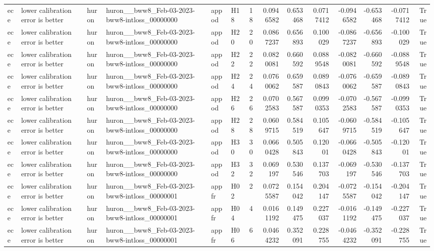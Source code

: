 \begin{longtable}{llllllrrrrrrrr}
ece & lower calibration error is better & huron & huron\_\_bww8\_Feb-03-2023-bww8-intloss\_00000000 & appod & H18 & 18 & 0.0946582 & 0.653468 & 0.0717412 & -0.0946582 & -0.653468 & -0.0717412 & True \\
ece & lower calibration error is better & huron & huron\_\_bww8\_Feb-03-2023-bww8-intloss\_00000000 & appod & H20 & 20 & 0.0867237 & 0.656893 & 0.100029 & -0.0867237 & -0.656893 & -0.100029 & True \\
ece & lower calibration error is better & huron & huron\_\_bww8\_Feb-03-2023-bww8-intloss\_00000000 & appod & H22 & 22 & 0.0820081 & 0.660592 & 0.0889548 & -0.0820081 & -0.660592 & -0.0889548 & True \\
ece & lower calibration error is better & huron & huron\_\_bww8\_Feb-03-2023-bww8-intloss\_00000000 & appod & H24 & 24 & 0.0760062 & 0.659587 & 0.0890843 & -0.0760062 & -0.659587 & -0.0890843 & True \\
ece & lower calibration error is better & huron & huron\_\_bww8\_Feb-03-2023-bww8-intloss\_00000000 & appod & H26 & 26 & 0.0702583 & 0.567587 & 0.0990353 & -0.0702583 & -0.567587 & -0.0990353 & True \\
ece & lower calibration error is better & huron & huron\_\_bww8\_Feb-03-2023-bww8-intloss\_00000000 & appod & H28 & 28 & 0.0609715 & 0.584519 & 0.105647 & -0.0609715 & -0.584519 & -0.105647 & True \\
ece & lower calibration error is better & huron & huron\_\_bww8\_Feb-03-2023-bww8-intloss\_00000000 & appod & H30 & 30 & 0.0660428 & 0.505843 & 0.12001 & -0.0660428 & -0.505843 & -0.12001 & True \\
ece & lower calibration error is better & huron & huron\_\_bww8\_Feb-03-2023-bww8-intloss\_00000000 & appod & H32 & 32 & 0.069197 & 0.530546 & 0.137703 & -0.069197 & -0.530546 & -0.137703 & True \\
ece & lower calibration error is better & huron & huron\_\_bww8\_Feb-03-2023-bww8-intloss\_00000001 & appfr & H02 & 2 & 0.0725587 & 0.154042 & 0.204147 & -0.0725587 & -0.154042 & -0.204147 & True \\
ece & lower calibration error is better & huron & huron\_\_bww8\_Feb-03-2023-bww8-intloss\_00000001 & appfr & H04 & 4 & 0.0161192 & 0.149475 & 0.227037 & -0.0161192 & -0.149475 & -0.227037 & True \\
ece & lower calibration error is better & huron & huron\_\_bww8\_Feb-03-2023-bww8-intloss\_00000001 & appfr & H06 & 6 & 0.0464232 & 0.352091 & 0.228755 & -0.0464232 & -0.352091 & -0.228755 & True \\

\end{longtable}
